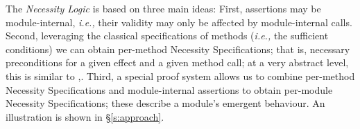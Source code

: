  
The \textit{Necessity Logic} is based on three main ideas: 
First, assertions may be module-internal, \textit{i.e.,}
their validity may only be affected by module-internal calls. 
Second, leveraging the classical  specifications of methods 
(\textit{i.e.,} the sufficient conditions) we can obtain per-method
 Necessity Specifications; that is, necessary preconditions
  for a given effect and a given method call;  at a very abstract level, this is
similar to  \cite{threoremsFreeSep},.
Third,  a special proof system allows us to combine 
per-method
 Necessity Specifications and module-internal assertions 
 to obtain per-module  Necessity Specifications; these describe a module's
 emergent behaviour.
An illustration is shown in  \S\ref{s:approach}.
 
% 
% 
%
% 
% 

